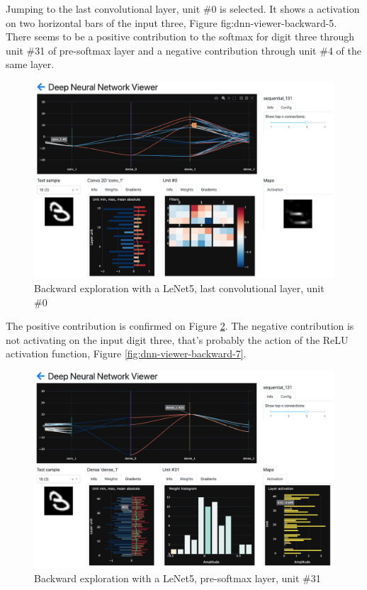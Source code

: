Jumping to the last convolutional layer, unit \#0 is selected. It shows a activation on two horizontal bars of the input three, Figure {fig:dnn-viewer-backward-5}. There seems to be a positive contribution to the softmax for digit three through unit \#31 of pre-softmax layer and a negative contribution through unit \#4 of the same layer.

\begin{figure}[H]
    \centering
    \includegraphics[scale=0.3]{images/dnn-viewer/BackwardThree_5.png}
    \caption{Backward exploration with a LeNet5, last convolutional layer, unit \#0}
    \label{fig:dnn-viewer-backward-5}
\end{figure}

The positive contribution is confirmed on Figure \ref{fig:dnn-viewer-backward-6}. The negative contribution is not activating on the input digit three, that's probably the action of the ReLU activation function, Figure \ref{fig:dnn-viewer-backward-7}.

\begin{figure}[H]
    \centering
    \includegraphics[scale=0.3]{images/dnn-viewer/BackwardThree_6.png}
    \caption{Backward exploration with a LeNet5, pre-softmax layer, unit \#31}
    \label{fig:dnn-viewer-backward-6}
\end{figure}

